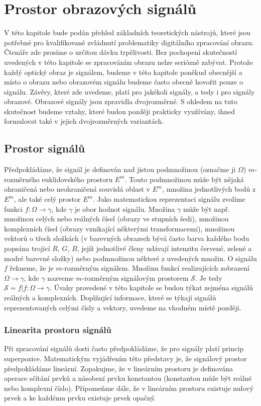 \chapter*{Prostor obrazových signálů}
%
V této kapitole bude podán přehled základních teoretických nástrojů, které jsou potřebné pro kvalifikované zvládnutí problematiky digitálního zpracování obrazu.
Čtenáře zde prosíme o určitou dávku trpělivosti. Bez pochopení skutečností uvedených v této kapitole se zpracováním obrazu nelze seriózně zabývat.
Protože každý optický obraz je signálem, budeme v této kapitole poněkud obecnější a místo o obrazu nebo obrazovém signálu budeme často obecně hovořit pouze o signálu.
Závěry, které zde uvedeme, platí pro jakékoli signály, a tedy i pro signály obrazové. Obrazové signály jsou zpravidla dvojrozměrné.
S ohledem na tuto skutečnost budeme vztahy, které budou později prakticky využívány, ihned formulovat také v jejich dvojrozměrných variantách.

\section*{Prostor signálů}

Předpokládáme, že signál je definován nad jistou podmnožinou (označme ji $\Omega$) $m$-rozměrného euklidovského prostoru $E^m$.
Touto podmnožinou může být nějaká ohraničená nebo neohraničená souvislá oblast v $E^m$, množina jednotlivých bodů z $E^m$, ale také celý prostor $E^m$.
Jako matematickou reprezentaci signálu zvolíme funkci $f:\Omega \rightarrow \gamma$, kde $\gamma$ je obor hodnot signálu.
Množina $\gamma$ může být např. množinou celých nebo reálných čísel (obrazy ve stupních šedi), množinou komplexních čísel
(obrazy vznikající některými transformacemi), množinou vektorů o třech složkách (v barevných obrazech bývá často barva každého bodu popsána trojicí $R$, $G$, $B$, jejíž jednotlivé členy udávají intenzitu červené, zelené a modré barevné složky) nebo podmnožinou některé z uvedených množin. O signálu $f$ řekneme, že je $m$-rozměrným signálem.
Množinu funkcí realizujících zobrazení $\Omega \rightarrow \gamma$, kde $\gamma$ nazveme $m$-rozměrným signálovým prostorem $\mathscr{S}$. Je tedy $\mathscr{S} = { f | f:\Omega \rightarrow \gamma }$.
Úvahy provedené v této kapitole se budou týkat zejména signálů reálných a komplexních.
Doplňující informace, které se týkají signálů reprezentovaných celými čísly a vektory, uvedeme na vhodném místě později.

\subsection*{Linearita prostoru signálů}
%
Při zpracování signálů dosti často předpokládáme, že pro signály platí princip superpozice.
Matematickým vyjádřením této představy je, že signálový prostor předpokládáme lineární.
Zopakujme, že v lineárním prostoru je definována operace sčítání prvků a násobení prvku konstantou (konstantou může být reálné nebo komplexní číslo).
Připomeňme dále, že v lineárním prostoru existuje nulový prvek a ke každému prvku existuje prvek opačný.

